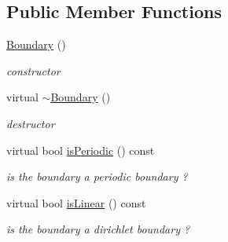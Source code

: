 \subsection*{Public Member Functions}
\begin{DoxyCompactItemize}
\item 
\hypertarget{classnatrium_1_1Boundary_a987978143b16ef0bbadd2b465dc1882d}{
\hyperlink{classnatrium_1_1Boundary_a987978143b16ef0bbadd2b465dc1882d}{Boundary} ()}
\label{classnatrium_1_1Boundary_a987978143b16ef0bbadd2b465dc1882d}

\begin{DoxyCompactList}\small\item\em constructor \item\end{DoxyCompactList}\item 
\hypertarget{classnatrium_1_1Boundary_a63e8fb8ec44288b9145f819b515ae6d9}{
virtual \hyperlink{classnatrium_1_1Boundary_a63e8fb8ec44288b9145f819b515ae6d9}{$\sim$Boundary} ()}
\label{classnatrium_1_1Boundary_a63e8fb8ec44288b9145f819b515ae6d9}

\begin{DoxyCompactList}\small\item\em destructor \item\end{DoxyCompactList}\item 
\hypertarget{classnatrium_1_1Boundary_acb651f4148b4e00f08258e1321c43235}{
virtual bool \hyperlink{classnatrium_1_1Boundary_acb651f4148b4e00f08258e1321c43235}{isPeriodic} () const }
\label{classnatrium_1_1Boundary_acb651f4148b4e00f08258e1321c43235}

\begin{DoxyCompactList}\small\item\em is the boundary a periodic boundary ? \item\end{DoxyCompactList}\item 
\hypertarget{classnatrium_1_1Boundary_aa76ef0eef351680cadb6299dca94ee89}{
virtual bool \hyperlink{classnatrium_1_1Boundary_aa76ef0eef351680cadb6299dca94ee89}{isLinear} () const }
\label{classnatrium_1_1Boundary_aa76ef0eef351680cadb6299dca94ee89}

\begin{DoxyCompactList}\small\item\em is the boundary a dirichlet boundary ? \item\end{DoxyCompactList}\end{DoxyCompactItemize}


